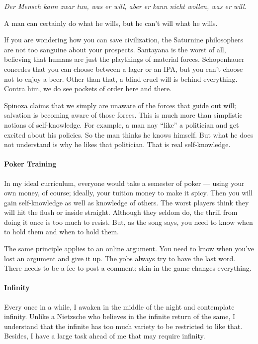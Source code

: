 \begin{quotex}
\emph{Der Mensch kann zwar tun, was er will, aber er kann nicht wollen, was er will.}

A man can certainly do what he wills, but he can't will what he wills.
\end{quotex}


If you are wondering how you can save civilization, the Saturnine philosophers are not too sanguine about your prospects. Santayana is the worst of all, believing that humans are just the playthings of material forces. Schopenhauer concedes that you can choose between a lager or an IPA, but you can't choose not to enjoy a beer. Other than that, a blind cruel will is behind everything. Contra him, we do see pockets of order here and there.

Spinoza claims that we simply are unaware of the forces that guide out will; salvation is becoming aware of those forces. This is much more than simplistic notions of self-knowledge. For example, a man nay ``like'' a politician and get excited about his policies. So the man thinks he knows himself. But what he does not understand is why he likes that politician. That is real self-knowledge.

\paragraph{Poker Training}


In my ideal curriculum, everyone would take a semester of poker --- using your own money, of course; ideally, your tuition money to make it spicy. Then you will gain self-knowledge as well as knowledge of others. The worst players think they will hit the flush or inside straight. Although they seldom do, the thrill from doing it once is too much to resist. But, as the song says, you need to know when to hold them and when to hold them.

The same principle applies to an online argument. You need to know when you've lost an argument and give it up. The yobs always try to have the last word. There needs to be a fee to post a comment; skin in the game changes everything.

\paragraph{Infinity}


Every once in a while, I awaken in the middle of the night and contemplate infinity. Unlike a Nietzsche who believes in the infinite return of the same, I understand that the infinite has too much variety to be restricted to like that. Besides, I have a large task ahead of me that may require infinity.

